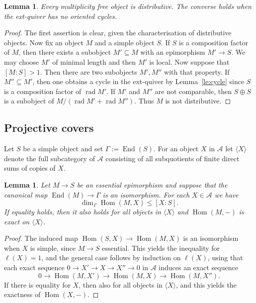 \documentclass[a4paper]{amsart}
\theoremstyle{plain}
\newtheorem{lem}[thm]{Lemma}
\theoremstyle{definition}
\theoremstyle{remark}
\numberwithin{equation}{section}
\renewcommand{\dim}{\operatorname{dim}}
\newcommand{\End}{\operatorname{End}}
\newcommand{\Hom}{\operatorname{Hom}}
\newcommand{\rad}{\operatorname{rad}}
\def\A{\mathcal A}
\def\Ga{\Gamma}
\begin{document}
\begin{lem}\label{le:mfree}
Every multiplicity free object is distributive. The converse holds
when the ext-quiver has no oriented cycles.
\end{lem}
\begin{proof}
  The first assertion is clear, given the characterisation of
  distributive objects. Now fix an object $M$ and a simple object
  $S$. If $S$ is a composition factor of $M$, then there exists a
  subobject $M'\subseteq M$ with an epimorphism $M'\to  S$. We may
  choose $M'$ of minimal length and then $M'$ is local.
  Now suppose that
  $[M:S]>1$. Then there are two subobjects $M',M''$ with that
  property. If $M''\subseteq M'$, then one obtains a cycle in the
  ext-quiver by Lemma~\ref{le:cycle} since $S$ is a composition factor
  of $\rad M'$. If $M'$ and $M''$ are not
  comparable, then $S\oplus S$ is a subobject of $M/(\rad M'+\rad
  M'')$. Thus $M$ is not distributive.
\end{proof}

\subsection*{Projective covers}

Let $S$ be a simple object and set $\Ga:=\End(S)$. For an object $X$ in
$\A$ let $\langle X\rangle$ denote the full subcategory of $\A$
consisting of all subquotients of finite direct sums of copies of $X$.

\begin{lem}\label{le:Hom-subquot}
  Let $M\to S$ be an essential epimorphism and suppose that the
  canonical map $\End(M)\to\Ga$ is an isomorphism.  For each $X\in\A$
  we have \begin{equation*}\label{eq:Hom-subquot} \dim_\Ga\Hom(M,X)\le
    [X:S].
\end{equation*}    
If equality holds, then it also holds for all objects in $\langle X\rangle$
and $\Hom(M,-)$ is exact on $\langle X\rangle$.
\end{lem}
\begin{proof}
  The induced map $\Hom(S,X)\to\Hom(M,X)$ is an isomorphism when $X$
  is simple, since $M\to S$ essential. This yields the inequality for
  $\ell(X)=1$, and the general case follows by induction on $\ell(X)$,
  using that each exact sequence $0\to X'\to X\to X''\to 0$ in $\A$
  induces an exact sequence
  \[0\to\Hom(M,X')\to\Hom(M,X)\to\Hom(M,X'').\] If there is equality
  for $X$, then also for all objects in $\langle X\rangle$, and this
  yields the exactness of $\Hom(X,-)$.
\end{proof}
\end{document}
